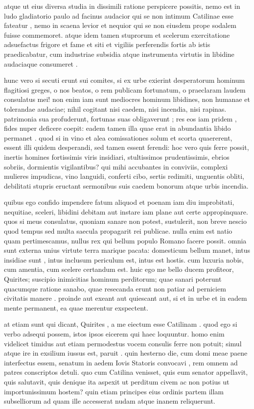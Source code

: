  atque ut eius diversa studia in dissimili ratione perspicere possitis, nemo est in ludo gladiatorio paulo ad facinus audacior qui se non intimum Catilinae esse fateatur , nemo in scaena levior et nequior qui se non eiusdem prope sodalem fuisse commemoret. atque idem tamen stuprorum et scelerum exercitatione adsuefactus frigore et fame et siti et vigiliis perferendis fortis ab istis praedicabatur, cum industriae subsidia atque instrumenta virtutis in libidine audaciaque consumeret .

 hunc vero si secuti erunt sui comites, si ex urbe exierint desperatorum hominum flagitiosi greges, o nos beatos, o rem publicam fortunatum, o praeclaram laudem consulatus mei! non enim iam sunt mediocres hominum libidines, non humanae et tolerandae audaciae; nihil cogitant nisi caedem, nisi incendia, nisi rapinas. patrimonia sua profuderunt, fortunas suas obligaverunt ; res eos iam pridem , fides nuper deficere coepit: eadem tamen illa quae erat in abundantia libido permanet . quod si in vino et alea comissationes solum et scorta quaererent, essent illi quidem desperandi, sed tamen essent ferendi: hoc vero quis ferre possit, inertis homines fortissimis viris insidiari, stultissimos prudentissimis, ebrios sobriis, dormientis vigilantibus? qui mihi accubantes in conviviis, complexi mulieres impudicas, vino languidi, conferti cibo, sertis redimiti, unguentis obliti, debilitati stupris eructant sermonibus suis caedem bonorum atque urbis incendia.

 quibus ego confido impendere fatum aliquod et poenam iam diu improbitati, nequitiae, sceleri, libidini debitam aut instare iam plane aut certe appropinquare. quos si meus consulatus, quoniam sanare non potest, sustulerit, non breve nescio quod tempus sed multa saecula propagarit rei publicae. nulla enim est natio quam pertimescamus, nullus rex qui bellum populo Romano facere possit. omnia sunt externa unius virtute terra marique pacata: domesticum bellum manet, intus insidiae sunt , intus inclusum periculum est, intus est hostis. cum luxuria nobis, cum amentia, cum scelere certandum est. huic ego me bello ducem profiteor, Quirites; suscipio inimicitias hominum perditorum; quae sanari poterunt quacumque ratione sanabo, quae resecanda erunt non patiar ad perniciem civitatis manere . proinde aut exeant aut quiescant aut, si et in urbe et in eadem mente permanent, ea quae merentur exspectent.

 at etiam sunt qui dicant, Quirites , a me eiectum esse Catilinam . quod ego si verbo adsequi possem, istos ipsos eicerem qui haec loquuntur. homo enim videlicet timidus aut etiam permodestus vocem consulis ferre non potuit; simul atque ire in exsilium iussus est, paruit . quin hesterno die, cum domi meae paene interfectus essem, senatum in aedem Iovis Statoris convocavi , rem omnem ad patres conscriptos detuli. quo cum Catilina venisset, quis eum senator appellavit, quis salutavit, quis denique ita aspexit ut perditum civem ac non potius ut importunissimum hostem? quin etiam principes eius ordinis partem illam subselliorum ad quam ille accesserat nudam atque inanem reliquerunt.

